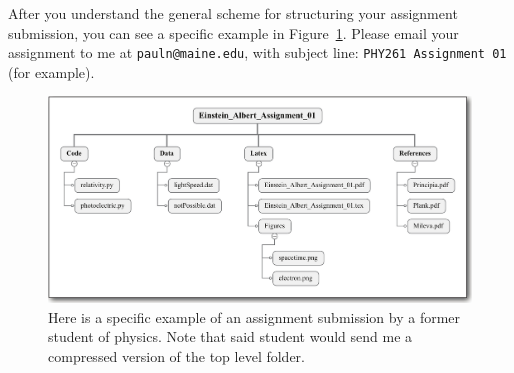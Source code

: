 After you understand the general scheme for structuring your assignment submission, you can see a specific example in Figure~\ref{fig:exampleSubmission}. Please email your assignment to me at \verb!pauln@maine.edu!, with subject line: \verb!PHY261 Assignment 01! (for example).

\begin{figure}[htb]
	\includegraphics[width=\textwidth]{Figures/digitalSubmission/example.pdf}
	\caption{Here is a specific example of an assignment submission by a former student of
	physics. Note that said student would send me a compressed version of the top level folder.}\label{fig:exampleSubmission}
\end{figure}

